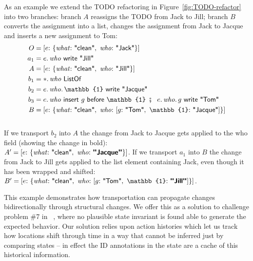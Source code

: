 \documentclass[english,submission]{programming}
\theoremstyle{definition}
\newcommand{\citet}[1]{\citeauthor*{#1}~\cite{#1}}
\newcommand{\mathbox}[1]{\colorbox{black!10}{$#1$}}
\DeclareMathOperator{\exec}{\ \fatsemi\ \ }
\newcommand{\is}{{:}\ }
\newcommand{\comma}{,\ }
\newcommand{\quotedstring}[1]{\textsf{\textquotedbl{#1}\textquotedbl}}
\begin{document}
As an example we extend the TODO refactoring in Figure~\ref{fig:TODO-refactor} into two branches: branch $A$ reassigns the TODO from Jack to Jill; branch $B$ converts the assignment into a list, changes the assignment from Jack to Jacque and inserts a new assignment to Tom:
\begin{align*}
  O &= [
    e \is \{ \mathit{what}\is \quotedstring{clean}\comma  \mathit{who}\is \quotedstring{Jack} \}
    ] \\
  a_1 &= e\ldotp\mathit{who}\textsf{ write } \quotedstring{Jill}\\
  A &= [
    e \is \{ \mathit{what}\is \quotedstring{clean}\comma  \mathit{who}\is \quotedstring{Jill} \}
    ] \\
  b_1 &= *\ldotp \mathit{who} \textsf{ ListOf } \\
  b_2 &= e\ldotp\mathit{who}\ldotp\mathbb{1} \textsf{ write } \quotedstring{Jacque} \\
  b_3 &= e\ldotp\mathit{who} \textsf{ insert } g \textsf{ before } \mathbb{1} \exec e\ldotp\mathit{who}\ldotp g \textsf{ write } \quotedstring{Tom} \\
  B &= [
    e \is \{ \mathit{what}\is \quotedstring{clean}\comma  \mathit{who}\is
    [ g \is \quotedstring{Tom} \comma \mathbb{1}\is \quotedstring{Jacque}] \}
    ] \\
  \end{align*}
  \vspace{-30pt}\\
If we transport $b_2$ into $A$ the change from Jack to Jacque gets applied to the \textsf{who} field (showing the change in bold):\\
\mathbox{A' =
[e \is \{ \mathit{what}\is \quotedstring{clean}\comma  \mathit{who}\is \textbf{\quotedstring{Jacque}} \}]}.
If we transport $a_1$ into $B$ the change from Jack to Jill gets applied to the list element containing Jack, even though it has been wrapped and shifted:\\
\mathbox{B' = [
    e \is \{ \mathit{what}\is \quotedstring{clean}\comma  \mathit{who}\is
    [ g \is \quotedstring{Tom} \comma \mathbb{1}\is \textbf{\quotedstring{Jill}}] \}
]}.

This example demonstrates how transportation can propagate changes bidirectionally through structural changes. We offer this as a solution to challenge problem \#7 in \citet{challenge-problems}, where no plausible state invariant is found able to generate the expected behavior. Our solution relies upon action histories which let us track how locations shift through time in a way that cannot be inferred just by comparing states -- in effect the ID annotations in the state are a cache of this historical information.
\end{document}
